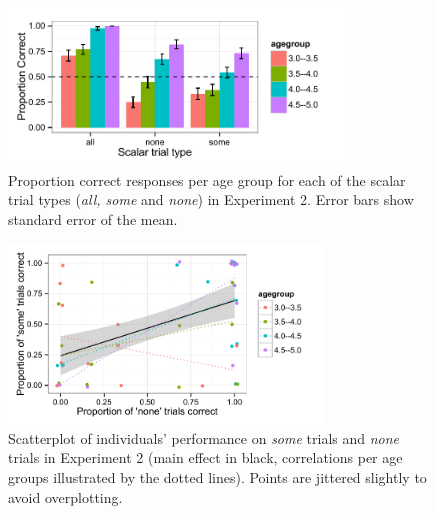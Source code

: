 \documentclass[10pt,letterpaper]{article}
\begin{document}


\begin{figure}[t] 
  \begin{center} 
    \includegraphics[width=3.5in]{figures/implicatures_scalarOnly_clean.pdf} 
    \caption{\label{fig:expt2} Proportion correct responses per age group for each of the scalar trial types (\emph{all, some} and \emph{none}) in Experiment 2. Error bars show standard error of the mean. }
    \end{center} 
\vspace{-1ex} 
\end{figure}

\begin{figure}[h] 
  \begin{center} 
    \includegraphics[width=3.3in]{figures/implicatures_scalarOnly_scatterplot.pdf} 
    \caption{\label{fig:expt2scatterplot} Scatterplot of individuals' performance on \emph{some} trials and \emph{none} trials in Experiment 2 (main effect in black, correlations per age groups illustrated by the dotted lines). Points are jittered slightly to avoid overplotting. }
    \end{center} 
\vspace{-1ex} 
\end{figure}
\end{document}
